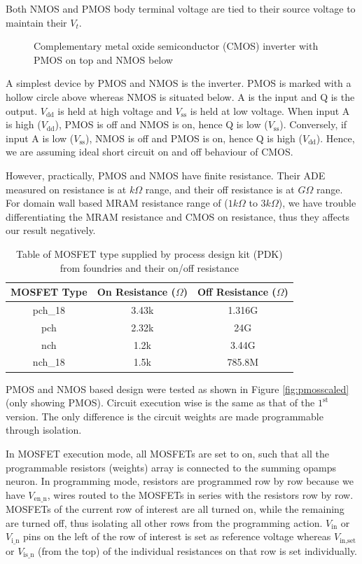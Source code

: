 Both NMOS and PMOS body terminal voltage are tied to their source voltage to maintain their $V_t$.
\begin{figure}[H]
	\centering
	\def\svgwidth{100pt}
	
	\caption{Complementary metal oxide semiconductor (CMOS) inverter with PMOS on top and NMOS below}
\end{figure}
A simplest device by PMOS and NMOS is the inverter. PMOS is marked with a hollow circle above whereas NMOS is situated below. A is the input and Q is the output. $V_{\text{dd}}$ is held at high voltage and $V_{\text{ss}}$ is held at low voltage. When input A is high ($V_{\text{dd}}$),  PMOS is off and NMOS is on, hence Q is low ($V_{\text{ss}}$). Conversely, if input A is low ($V_{\text{ss}}$),  NMOS is off and PMOS is on, hence Q is high ($V_{\text{dd}}$). Hence, we are assuming ideal short circuit on and off behaviour of CMOS.

However, practically, PMOS and NMOS have finite resistance. Their ADE measured on resistance is at $k\Omega$ range, and their off resistance is at $G\Omega$ range. For domain wall based MRAM resistance range of ($1k\Omega$ to $3k\Omega$), we have trouble differentiating the MRAM resistance and CMOS on resistance, thus they affects our result negatively.
\begin{table}[H]
	\centering
	\begin{tabular}[t]{ccc}
		\hline
		MOSFET Type & On Resistance ($\Omega$) & Off Resistance ($\Omega$)\\
		\hline
		\hline
		pch\_18 & 3.43k & 1.316G\\
		pch & 2.32k & 24G\\
		nch & 1.2k & 3.44G\\
		nch\_18 &  1.5k & 785.8M\\            
		\hline
	\end{tabular}
	\caption{Table of MOSFET type supplied by process design kit (PDK) from foundries and their on/off resistance}
\end{table}
PMOS and NMOS based design were tested as shown in Figure \ref{fig:pmosscaled} (only showing PMOS). Circuit execution wise is the same as that of the $\text{1}^{\text{st}}$ version. The only difference is the circuit weights are made programmable through isolation.

In MOSFET execution mode, all MOSFETs are set to on, such that all the programmable resistors (weights) array is connected to the summing opamps neuron. In programming mode, resistors are programmed row by row because we have $V_{\text{en\_n}}$, wires routed to the MOSFETs in series with the resistors row by row. MOSFETs of the current row of interest are all turned on, while the remaining are turned off, thus isolating all other rows from the programming action. $V_{\text{in}}$ or $V_{\text{i\_n}}$ pins on the left of the row of interest is set as reference voltage whereas $V_{\text{in,set}}$ or $V_{\text{is\_n}}$ (from the top) of the individual resistances on that row is set individually.

